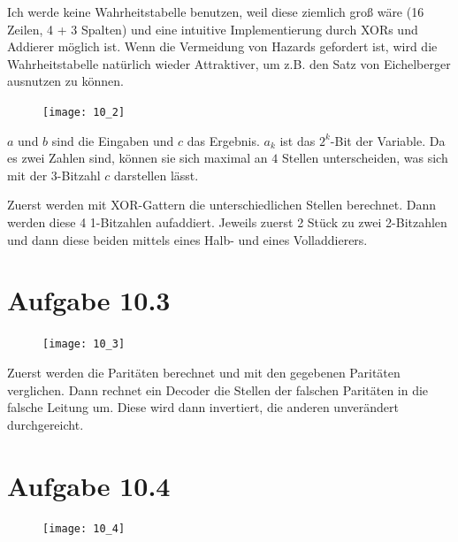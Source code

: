 \documentclass[10pt,a4paper]{article}
\begin{document}
Ich werde keine Wahrheitstabelle benutzen, weil diese ziemlich groß wäre (16 Zeilen, 4 + 3 Spalten) und eine intuitive Implementierung durch XORs und Addierer möglich ist.
Wenn die Vermeidung von Hazards gefordert ist, wird die Wahrheitstabelle natürlich wieder Attraktiver, um z.B. den Satz von Eichelberger ausnutzen zu können.

\begin{figure}[H]
\texttt{[image: 10\_2]}
\end{figure}

$a$ und $b$ sind die Eingaben und $c$ das Ergebnis.
$a_k$ ist das $2^k$-Bit der Variable.
Da es zwei Zahlen sind, können sie sich maximal an $4$ Stellen unterscheiden, was sich mit der 3-Bitzahl $c$ darstellen lässt.

Zuerst werden mit XOR-Gattern die unterschiedlichen Stellen berechnet.
Dann werden diese 4 1-Bitzahlen aufaddiert.
Jeweils zuerst 2 Stück zu zwei 2-Bitzahlen und dann diese beiden mittels eines Halb- und eines Volladdierers.

\section*{Aufgabe 10.3}

\begin{figure}[H]
\texttt{[image: 10\_3]}
\end{figure}

Zuerst werden die Paritäten berechnet und mit den gegebenen Paritäten verglichen.
Dann rechnet ein Decoder die Stellen der falschen Paritäten in die falsche Leitung um.
Diese wird dann invertiert, die anderen unverändert durchgereicht.

\section*{Aufgabe 10.4}

\begin{figure}[H]
\texttt{[image: 10\_4]}
\end{figure}
\end{document}
